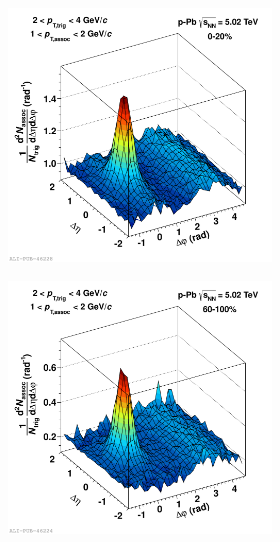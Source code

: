 \begin{figure}
  \centering
  \begin{subfigure}[m]{.4\textwidth}
    \begin{subfigure}[b]{\textwidth}
      \includegraphics[width=\textwidth]{figures/ty_cent_exampel.pdf}
    \end{subfigure}
    \begin{subfigure}[b]{\textwidth}
      \includegraphics[width=\textwidth]{figures/ty_peri_exampel.pdf}

\end{subfigure}
\end{subfigure}
\end{figure}
